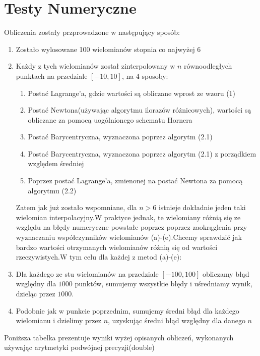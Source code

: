 \documentclass[11pt,wide]{article}
\begin{document}
\section{Testy Numeryczne}
Obliczenia zostały przprowadzone w następujący sposób:
\begin{enumerate}
\item Zostało wylosowane 100 wielomianów stopnia co najwyżej 6
\item Każdy z tych wielomianów został zinterpolowany w $n$ równoodległych punktach na przedziale $[-10,10]$, na 4 sposoby:
\begin{enumerate}
\item Postać Lagrange'a, gdzie wartości są obliczane wprost ze wzoru (1)
\item Postać Newtona(używając algorytmu ilorazów różnicowych), wartości są obliczane za pomocą uogólnionego schematu Hornera
\item Postać Barycentryczna, wyznaczona poprzez algorytm (2.1)
\item Postać Barycentryczna, wyznaczona poprzez algorytm (2.1) z porządkiem względem średniej
\item Poprzez postać Lagrange'a, zmienonej na postać Newtona za pomocą algorytmu (2.2)
\end{enumerate}
Zatem jak już zostało wspomniane, dla $n>6$ istnieje dokładnie jeden taki wielomian interpolacyjny.W praktyce jednak, te wielomiany różnią się ze względu na błędy numeryczne powstałe poprzez poprzez zaokrąglenia przy wyznaczaniu współczynników wielomianów (a)-(e).Chcemy sprawdzić jak bardzo wartości otrzymanych wielomianów różnią się od wartości rzeczywistych.W tym celu dla każdej z metod (a)-(e):
\item Dla każdego ze stu wielomianów na przedziale $[-100,100]$ obliczamy błąd względny dla $1000$ punktów, sumujemy wszystkie błędy i uśredniamy wynik, dzieląc przez $1000$.
\item Podobnie jak w punkcie poprzednim, sumujemy średni błąd dla każdego wielomianu i dzielimy przez $n$, uzyskując średni błąd względny dla danego $n$
\end{enumerate}
\noindent
Poniższa tabelka prezentuje wyniki wyżej opisanych obliczeń, wykonanych używając arytmetyki podwójnej precyzji(double)
\end{document}
